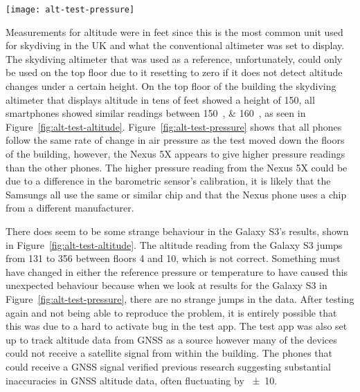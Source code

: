 

\begin{figure*}[ht]
  \centering
  \texttt{[image: alt-test-pressure]}
  \caption{Air pressure measurements from smartphones in Muirhead Tower}\label{fig:alt-test-pressure}
\end{figure*}

Measurements for altitude were in feet since this is the most common unit used for skydiving in the UK and what the conventional altimeter was set to display. The skydiving altimeter that was used as a reference, unfortunately, could only be used on the top floor due to it resetting to zero if it does not detect altitude changes under a certain height. On the top floor of the building the skydiving altimeter that displays altitude in tens of feet showed a height of \SI{150}{\feet}, all smartphones showed similar readings between \SIlist{150; 160}{\feet}, as seen in Figure~\ref{fig:alt-test-altitude}.
Figure~\ref{fig:alt-test-pressure} shows that all phones follow the same rate of change in air pressure as the test moved down the floors of the building, however, the Nexus 5X appears to give higher pressure readings than the other phones. The higher pressure reading from the Nexus 5X could be due to a difference in the barometric sensor's calibration, it is likely that the Samsungs all use the same or similar chip and that the Nexus phone uses a chip from a different manufacturer.

There does seem to be some strange behaviour in the Galaxy S3's results, shown in Figure~\ref{fig:alt-test-altitude}. The altitude reading from the Galaxy S3 jumps from \SI{131}{\feet} to \SI{356}{\feet} between floors 4 and 10, which is not correct. Something must have changed in either the reference pressure or temperature to have caused this unexpected behaviour because when we look at results for the Galaxy S3 in Figure~\ref{fig:alt-test-pressure}, there are no strange jumps in the data. After testing again and not being able to reproduce the problem, it is entirely possible that this was due to a hard to activate bug in the test app. The test app was also set up to track altitude data from GNSS as a source however many of the devices could not receive a satellite signal from within the building. The phones that could receive a GNSS signal verified previous research suggesting substantial inaccuracies in GNSS altitude data, often fluctuating by \SI{\pm10}{\feet}.

